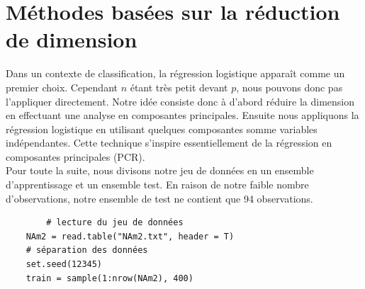 \documentclass[12pt,a4paper]{article}
\begin{document}
\section{Méthodes basées sur la réduction de dimension}
Dans un contexte de classification, la régression logistique apparaît comme un premier choix. Cependant $n$ étant très petit devant $p$, nous pouvons donc pas l'appliquer directement. Notre idée consiste donc à d'abord réduire la dimension en effectuant une analyse en composantes principales. Ensuite nous appliquons la régression logistique en utilisant quelques composantes somme variables indépendantes. Cette technique s'inspire essentiellement de la régression en composantes principales (PCR).\vspace{2mm}\\
Pour toute la suite, nous divisons notre jeu de données en un ensemble d'apprentissage et un ensemble test. En raison de notre faible nombre d'observations, notre ensemble de test ne contient que 94 observations.\vspace{2mm}
\begin{lstlisting}
		# lecture du jeu de données
	NAm2 = read.table("NAm2.txt", header = T)
	# séparation des données
	set.seed(12345)
	train = sample(1:nrow(NAm2), 400)
\end{lstlisting}
\end{document}
